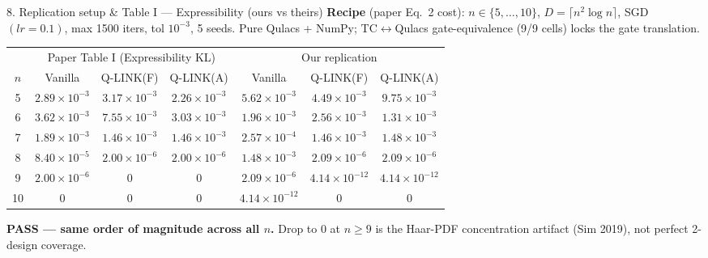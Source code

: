 \documentclass[10pt, aspectratio=169]{beamer}
\newcommand{\theirs}[1]{\textcolor{theirs}{#1}}
\newcommand{\ours}[1]{\textcolor{ours}{#1}}
\begin{document}
\begin{frame}{8. Replication setup \& Table I — Expressibility (ours vs theirs)}
    \scriptsize
    \textbf{Recipe} (paper Eq.\ 2 cost): $n \in \{5,\dots,10\}$, $D = \lceil n^2 \log n\rceil$, SGD$(lr\!=\!0.1)$, max 1500 iters, tol $10^{-3}$, 5 seeds.
    Pure Qulacs + NumPy; TC$\leftrightarrow$Qulacs gate-equivalence (9/9 cells) locks the gate translation.

    \vspace{0.3em}\centering
    \begin{tabular}{c|ccc|ccc}\toprule
    & \multicolumn{3}{c|}{\theirs{Paper Table I (Expressibility KL)}}
    & \multicolumn{3}{c}{\ours{Our replication}} \\
    $n$ & Vanilla & Q-LINK(F) & Q-LINK(A) & Vanilla & Q-LINK(F) & Q-LINK(A) \\\midrule
    5 & \theirs{$2.89\!\times\!10^{-3}$} & \theirs{$3.17\!\times\!10^{-3}$} & \theirs{$2.26\!\times\!10^{-3}$} & \ours{$5.62\!\times\!10^{-3}$} & \ours{$4.49\!\times\!10^{-3}$} & \ours{$9.75\!\times\!10^{-3}$} \\
    6 & \theirs{$3.62\!\times\!10^{-3}$} & \theirs{$7.55\!\times\!10^{-3}$} & \theirs{$3.03\!\times\!10^{-3}$} & \ours{$1.96\!\times\!10^{-3}$} & \ours{$2.56\!\times\!10^{-3}$} & \ours{$1.31\!\times\!10^{-3}$} \\
    7 & \theirs{$1.89\!\times\!10^{-3}$} & \theirs{$1.46\!\times\!10^{-3}$} & \theirs{$1.46\!\times\!10^{-3}$} & \ours{$2.57\!\times\!10^{-4}$} & \ours{$1.46\!\times\!10^{-3}$} & \ours{$1.48\!\times\!10^{-3}$} \\
    8 & \theirs{$8.40\!\times\!10^{-5}$} & \theirs{$2.00\!\times\!10^{-6}$} & \theirs{$2.00\!\times\!10^{-6}$} & \ours{$1.48\!\times\!10^{-3}$} & \ours{$2.09\!\times\!10^{-6}$} & \ours{$2.09\!\times\!10^{-6}$} \\
    9 & \theirs{$2.00\!\times\!10^{-6}$} & \theirs{$0$} & \theirs{$0$} & \ours{$2.09\!\times\!10^{-6}$} & \ours{$4.14\!\times\!10^{-12}$} & \ours{$4.14\!\times\!10^{-12}$} \\
    10 & \theirs{$0$} & \theirs{$0$} & \theirs{$0$} & \ours{$4.14\!\times\!10^{-12}$} & \ours{$0$} & \ours{$0$} \\
    \bottomrule
    \end{tabular}
    \vspace{0.3em}
    \textbf{\textcolor{pass}{PASS — same order of magnitude across all $n$.}} Drop to 0 at $n \ge 9$ is the
    Haar-PDF concentration artifact (Sim 2019), not perfect 2-design coverage.
\end{frame}
\end{document}
